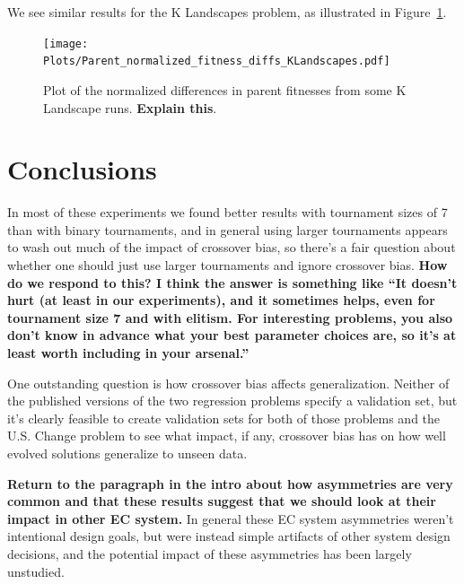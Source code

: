 \documentclass{sig-alternate}
\begin{document}
We see similar results for the K Landscapes problem, as illustrated in Figure~\ref{fig:parentDiffsKLandscapes}.

\begin{figure}
\centering
\texttt{[image: Plots/Parent\_normalized\_fitness\_diffs\_KLandscapes.pdf]}
\caption{Plot of the normalized differences in parent fitnesses from some K Landscape runs. \textbf{Explain this}.}
\label{fig:parentDiffsKLandscapes}
\end{figure}

\section{Conclusions} \label{sec:Conclusions}

In most of these experiments we found better results with tournament sizes of 7 than with binary tournaments, and in 
general using larger tournaments appears to wash out much of the impact of crossover bias, so there's a fair question 
about whether one should just use larger tournaments and ignore crossover bias. \textbf{How do we respond to this? I 
think the answer is something like ``It doesn't hurt (at least in our experiments), and it sometimes helps, even for 
tournament size 7 and with elitism. For interesting problems, you also don't know in advance what your best parameter 
choices are, so it's at least worth including in your arsenal.''}

One outstanding question is how crossover bias affects generalization. Neither of the published versions 
of the two regression problems specify a validation set, but it's clearly feasible to create validation sets 
for both of those problems and the U.S. Change problem to see what impact, if any, crossover bias has 
on how well evolved solutions generalize to unseen data.

\textbf{Return to the paragraph in the intro about how asymmetries are very common and that these results suggest that we should look at their impact in other EC system.}
In general these 
EC system
asymmetries weren't intentional design goals, but were instead simple artifacts of other system design decisions, and 
the potential impact of these asymmetries has been largely unstudied.






\end{document}
